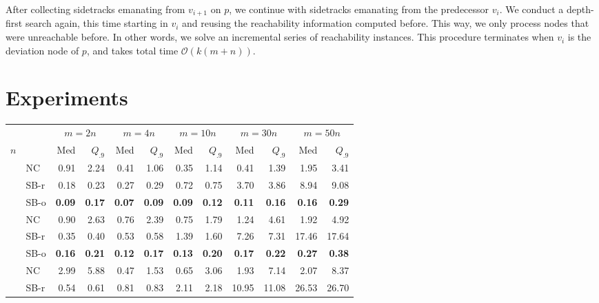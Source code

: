 \documentclass[runningheads,a4paper]{llncs}
\begin{document}
After collecting sidetracks emanating from $v_{i + 1}$ on $p$, we continue with sidetracks emanating from the predecessor $v_i$.
We conduct a depth-first search again, this time starting in $v_i$ and reusing the reachability information computed before.
This way, we only process nodes that were unreachable before.
In other words, we solve an incremental series of reachability instances.
This procedure terminates when $v_i$ is the deviation node of $p$, and takes total time $\mathcal O(k(m + n))$.


\section{Experiments}
\label{sec:experiments}

\begin{table}[tb]
\scriptsize
\centering
\begin{tabularx}{1\textwidth}{p{0.8cm}p{0.8cm}|RR|RR|RR|RR|RR}
& &  &  &  &  &  \\
 \centering $n$ & & Med & $Q_{.9}$ & Med & $Q_{.9}$ & Med & $Q_{.9}$ & Med & $Q_{.9}$ & Med & $Q_{.9}$ \\
\hline
\centering{} & \centering NC & 0.91 & 2.24 & 0.41 & 1.06 & 0.35 & 1.14 & 0.41 & 1.39 & 1.95 & 3.41 \\
& \centering SB-r  & 0.18 & 0.23 & 0.27 & 0.29 & 0.72 & 0.75 & 3.70 & 3.86 & 8.94 & 9.08 \\
& \centering SB-o  & \textbf{0.09} & \textbf{0.17} & \textbf{0.07} & \textbf{0.09} & \textbf{0.09} & \textbf{0.12} & \textbf{0.11} & \textbf{0.16} & \textbf{0.16} & \textbf{0.29} \\
\hline
\centering{} & \centering NC & 0.90 & 2.63 & 0.76 & 2.39 & 0.75 & 1.79 & 1.24 & 4.61 & 1.92 & 4.92 \\
& \centering SB-r  & 0.35 & 0.40 & 0.53 & 0.58 & 1.39 & 1.60 & 7.26 & 7.31 & 17.46 & 17.64 \\
& \centering SB-o  & \textbf{0.16} & \textbf{0.21} & \textbf{0.12} & \textbf{0.17} & \textbf{0.13} & \textbf{0.20} & \textbf{0.17} & \textbf{0.22} & \textbf{0.27} & \textbf{0.38} \\
\hline
\centering{} & \centering NC & 2.99 & 5.88 & 0.47 & 1.53 & 0.65 & 3.06 & 1.93 & 7.14 & 2.07 & 8.37 \\
& \centering SB-r  & 0.54 & 0.61 & 0.81 & 0.83 & 2.11 & 2.18 & 10.95 & 11.08 & 26.53 & 26.70 \\

\end{tabularx}
\end{table}
\end{document}
